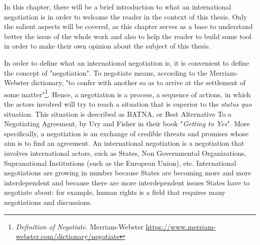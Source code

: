 \documentclass[../main.tex]{subfiles}
\begin{document}
\label{chap:2}

In this chapter, there will be a brief introduction to what an international negotiation is in order to welcome the reader in the context of this thesis. Only the salient aspects will be covered, as this chapter serves as a base to understand better the issue of the whole work and also to help the reader to build some tool in order to make their own opinion about the subject of this thesis.

In order to define what an international negotiation is, it is convenient to define the concept of "negotiation". To negotiate means, according to the Merriam-Webster dictionary, "to confer with another so as to arrive at the settlement of some matter"\footnote{\textit{Definition of Negotiate}. Merriam-Webster \url{https://www.merriam-webster.com/dictionary/negotiate}}. Hence, a negotiation is a process, a sequence of actions, in which the actors involved will try to reach a situation that is superior to the \textit{status quo} situation. This situation is described as BATNA, or Best Alternative To a Negotiating Agreement, by Ury and Fisher in their book "\textit{Getting to Yes}". More specifically, a negotiation is an exchange of credible threats and promises whose aim is to find an agreement. An international negotiation is a negotiation that involves international actors, such as States, Non Governmental Organizations, Supranational Institutions (such as the European Union), etc. International negotiations are growing in number because States are becoming more and more interdependent and because there are more interdependent issues States have to negotiate about: for example, human rights is a field that requires many negotiations and discussions.
\end{document}
